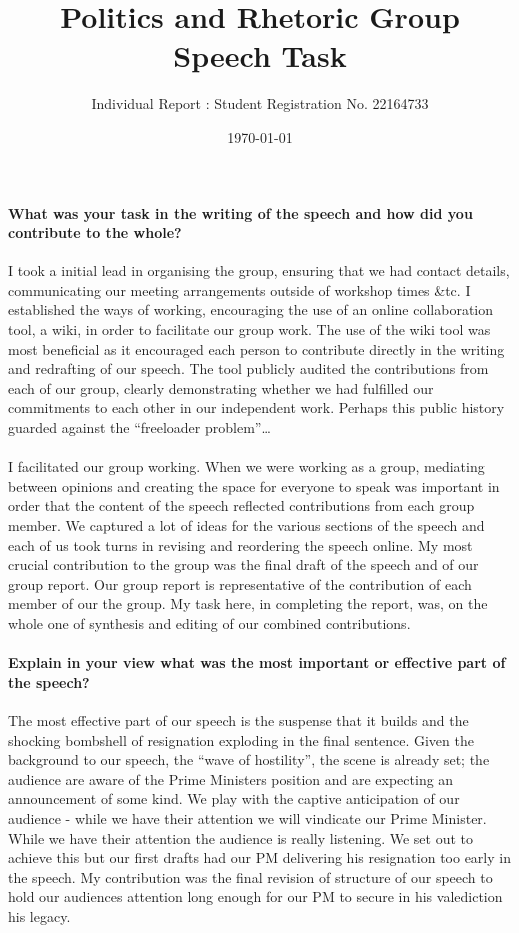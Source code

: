 \documentclass{article}
\title{Politics and Rhetoric Group Speech Task}
\author{Individual Report : Student Registration No. 22164733}
\date{\today}
\begin{document}
\begin{doublespace}

\maketitle

\paragraph{What was your task in the writing of the speech and how did you contribute to the whole?} I took a initial lead in organising the group, ensuring that we had contact details, communicating our meeting arrangements outside of workshop times \&tc. I established the ways of working, encouraging the use of an online collaboration tool, a wiki, in order to facilitate our group work. The use of the wiki tool was most beneficial as it encouraged each person to contribute directly in the writing and redrafting of our speech. The tool publicly audited the contributions from each of our group, clearly demonstrating whether we had fulfilled our commitments to each other in our independent work. Perhaps this public history guarded against the ``freeloader problem''\ldots

\paragraph{}I facilitated our group working. When we were working as a group, mediating between opinions and creating the space for everyone to speak was important in order that the content of the speech reflected contributions from each group member. We captured a lot of ideas for the various sections of the speech and each of us took turns in revising and reordering the speech online. My most crucial contribution to the group was the final draft of the speech and of our group report. Our group report is representative of the contribution of each member of our the group. My task here, in completing the report, was, on the whole one of synthesis and editing of our combined contributions.

\paragraph{Explain in your view what was the most important or effective part of the speech?}The most effective part of our speech is the suspense that it builds and the shocking bombshell of resignation exploding in the final sentence. Given the background to our speech, the ``wave of hostility'', the scene is already set; the audience are aware of the Prime Ministers position and are expecting an announcement of some kind. We play with the captive anticipation of our audience - while we have their attention we will vindicate our Prime Minister. While we have their attention the audience is really listening. We set out to achieve this but our first drafts had our PM delivering his resignation too early in the speech. My contribution was the final revision of structure of our speech to hold our audiences attention long enough for our PM to secure in his valediction his legacy.



\end{doublespace}
\newpage

\end{document}
